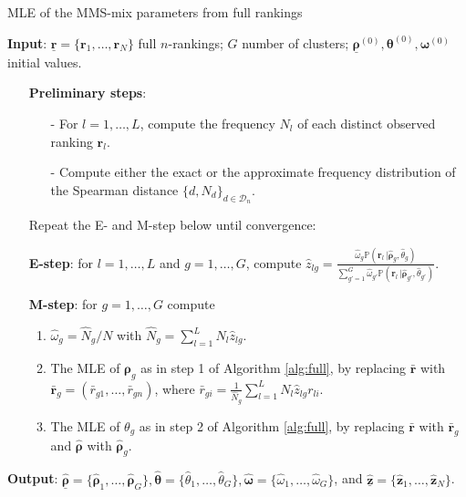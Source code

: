 \begin{algorithm}[h]\small
\caption{MLE of the MMS-mix parameters from full rankings}
\label{alg:full_mixture}
\hspace*{\algorithmicindent} \textbf{Input}: $\underline{\bm{r}}=\{\bm{r}_1,\dots,\bm{r}_N\}$ full $n$-rankings; $G$ number of clusters; $\underline{\bm{\rho}}^{(0)}, \bm{\theta}^{(0)}, \bm{\omega}^{(0)}$ initial values. 

\begin{enumerate}
\item[] \textbf{Preliminary steps}: 
\begin{itemize}
    \item[-] For $l=1,\dots,L$, compute the frequency $N_l$ of each distinct observed ranking $\bm{r}_l$.
    \item[-] Compute either the exact or the
approximate frequency distribution of the Spearman distance $\{d,N_d\}_{d\in\mathcal{D}_n}$.
    \end{itemize}

     \item[] Repeat the E- and M-step below until convergence:
    \item[] \textbf{E-step}: for $l=1,\dots,L$ and $g=1,\dots,G$, compute 
$ \hat z_{lg} = \frac{\hat\omega_g\mathbb{P}(\bm{r}_l\,|\hat{\bm{\rho}}_g,\hat\theta_g)}{\sum_{g\prime=1}^G\hat\omega_{g\prime}\mathbb{P}(\bm{r}_l\,|\hat{\bm{\rho}}_{g\prime},\hat\theta_{g\prime})}$.
    \item[]\textbf{M-step}: for $g=1,\dots,G$ compute
    \begin{enumerate}
        \item $\hat \omega_g =\hat{N}_g/N$ with $\hat{N}_g =\sum_{l=1}^L N_l \hat z_{lg}$.  
        \item The MLE of $\bm\rho_g$ as in step 1 of Algorithm \ref{alg:full},  by replacing $\bar{\bm r}$ with\\ 
        $\bar{\bm r}_g = (\bar r_{g1},\dots, \bar r_{gn})$, where $\bar r_{gi} = \frac{1}{\hat N_g}\sum_{l=1}^L N_l\hat z_{lg}r_{li}$.
        \item The MLE of $\theta_g$ as in step 2 of Algorithm \ref{alg:full}, by replacing $\bar{\bm r}$ with $\bar{\bm r}_g$ and $\hat{\bm\rho}$ with $\hat{\bm\rho}_g$.
    \end{enumerate}
\end{enumerate}
    \hspace*{\algorithmicindent} \textbf{Output}: $\underline{\hat{\bm{\rho}}}=\{\hat{\bm{\rho}}_1,\dots,\hat{\bm{\rho}}_G\},{\hat{\bm\theta}}=\{\hat{\theta}_1,\dots,\hat{\theta}_G\},{\hat{\bm\omega}}=\{\hat\omega_1,\dots,\hat\omega_G\}$, and $\underline{\hat{\bm z}}=\{\bm \hat z_1,\dots,\bm \hat z_N\}$. 
\end{algorithm}



